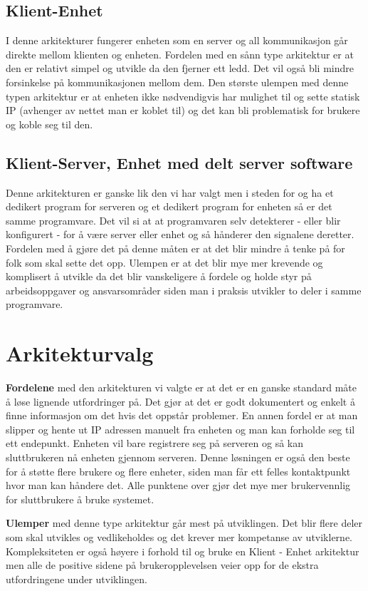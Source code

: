 \documentclass[12pt]{report}
\begin{document}
\subsection{Klient-Enhet}
I denne arkitekturer fungerer enheten som en server og all kommunikasjon går direkte mellom klienten og enheten. Fordelen med en sånn type arkitektur er at den er relativt simpel og utvikle da den fjerner ett ledd. Det vil også bli mindre forsinkelse på kommunikasjonen mellom dem. Den største ulempen med denne typen arkitektur er at enheten ikke nødvendigvis har mulighet til og sette statisk IP (avhenger av nettet man er koblet til) og det kan bli problematisk for brukere og koble seg til den.

\subsection{Klient-Server, Enhet med delt server software}
Denne arkitekturen er ganske lik den vi har valgt men i steden for og ha et dedikert program for serveren og et dedikert program for enheten så er det samme programvare. Det vil si at at programvaren selv detekterer - eller blir konfigurert - for å være server eller enhet og så hånderer den signalene deretter. Fordelen med å gjøre det på denne måten er at det blir mindre å tenke på for folk som skal sette det opp. Ulempen er at det blir mye mer krevende og komplisert å utvikle da det blir vanskeligere å fordele og holde styr på arbeidsoppgaver og ansvarsområder siden man i praksis utvikler to deler i samme programvare.

\section{Arkitekturvalg}
\textbf{Fordelene} med den arkitekturen vi valgte er at det er en ganske standard måte å løse lignende utfordringer på. Det gjør at det er godt dokumentert og enkelt å finne informasjon om det hvis det oppstår problemer. En annen fordel er at man slipper og hente ut IP adressen manuelt fra enheten og man kan forholde seg til ett endepunkt. Enheten vil bare registrere seg på serveren og så kan sluttbrukeren nå enheten gjennom serveren. Denne løsningen er også den beste for å støtte flere brukere og flere enheter, siden man får ett felles kontaktpunkt hvor man kan håndere det. Alle punktene over gjør det mye mer brukervennlig for sluttbrukere å bruke systemet.

\textbf{Ulemper} med denne type arkitektur går mest på utviklingen. Det blir flere deler som skal utvikles og vedlikeholdes og det krever mer kompetanse av utviklerne. Kompleksiteten er også høyere i forhold til og bruke en Klient - Enhet arkitektur men alle de positive sidene på brukeropplevelsen veier opp for de ekstra utfordringene under utviklingen.
\end{document}
